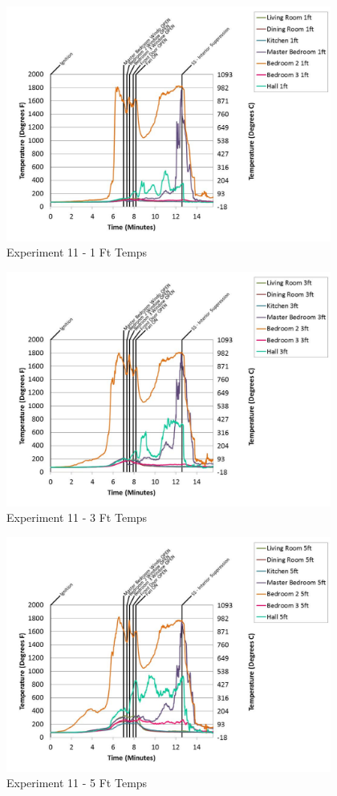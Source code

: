 \documentclass{article}
\begin{document}
\begin{appendices}
	\begin{figure}[h!]
		\centering
		\includegraphics[height=3.05in]{0_Images/Results_Charts/Exp_11_Charts/1FtTemps.pdf}
		\caption{Experiment 11 - 1 Ft Temps}
	\end{figure}
 

	\begin{figure}[h!]
		\centering
		\includegraphics[height=3.05in]{0_Images/Results_Charts/Exp_11_Charts/3FtTemps.pdf}
		\caption{Experiment 11 - 3 Ft Temps}
	\end{figure}
 
	\clearpage

	\begin{figure}[h!]
		\centering
		\includegraphics[height=3.05in]{0_Images/Results_Charts/Exp_11_Charts/5FtTemps.pdf}
		\caption{Experiment 11 - 5 Ft Temps}
	\end{figure}
 


\end{appendices}
\end{document}
